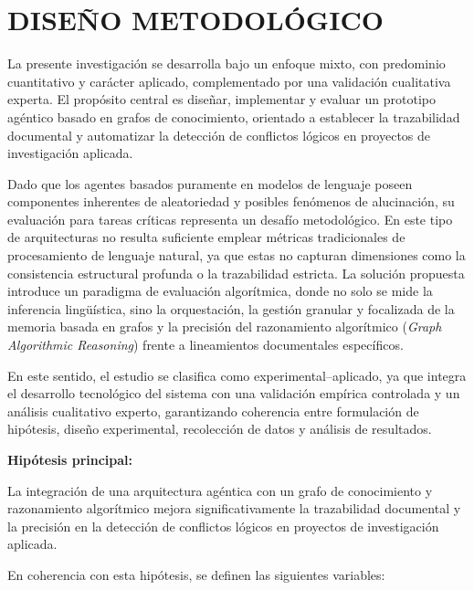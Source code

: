 \documentclass[12pt,letterpaper]{article}
\begin{document}
\section{DISEÑO METODOLÓGICO}
\vspace{-0.5cm}


La presente investigación se desarrolla bajo un enfoque mixto, con predominio cuantitativo y carácter aplicado, complementado por una validación cualitativa experta. El propósito central es diseñar, implementar y evaluar un prototipo agéntico basado en grafos de conocimiento, orientado a establecer la trazabilidad documental y automatizar la detección de conflictos lógicos en proyectos de investigación aplicada.

Dado que los agentes basados puramente en modelos de lenguaje poseen componentes inherentes de aleatoriedad y posibles fenómenos de alucinación, su evaluación para tareas críticas representa un desafío metodológico. En este tipo de arquitecturas no resulta suficiente emplear métricas tradicionales de procesamiento de lenguaje natural, ya que estas no capturan dimensiones como la consistencia estructural profunda o la trazabilidad estricta. La solución propuesta introduce un paradigma de evaluación algorítmica, donde no solo se mide la inferencia lingüística, sino la orquestación, la gestión granular y focalizada de la memoria basada en grafos y la precisión del razonamiento algorítmico (\textit{Graph Algorithmic Reasoning}) frente a lineamientos documentales específicos.

En este sentido, el estudio se clasifica como experimental–aplicado, ya que integra el desarrollo tecnológico del sistema con una validación empírica controlada y un análisis cualitativo experto, garantizando coherencia entre formulación de hipótesis, diseño experimental, recolección de datos y análisis de resultados.

\vspace{0.3cm}
\textbf{Hipótesis principal:}

La integración de una arquitectura agéntica con un grafo de conocimiento y razonamiento algorítmico mejora significativamente la trazabilidad documental y la precisión en la detección de conflictos lógicos en proyectos de investigación aplicada.

\vspace{0.3cm}
En coherencia con esta hipótesis, se definen las siguientes variables:
\end{document}
